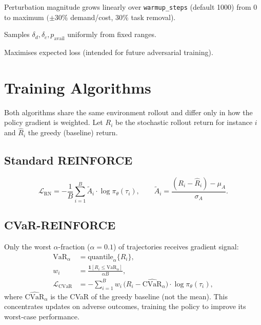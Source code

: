 \documentclass[11pt,a4paper]{article}
\begin{document}
\begin{description}[nosep]
  \item[\texttt{curriculum}:] Perturbation magnitude grows linearly over
        \texttt{warmup\_steps} (default 1000) from 0 to maximum
        $(\pm 30\%$ demand/cost, 30\% task removal).
  \item[\texttt{uniform}:] Samples $\delta_d, \delta_c, p_\text{avail}$
        uniformly from fixed ranges.
  \item[\texttt{adversarial}:] Maximises expected loss (intended for future
        adversarial training).
\end{description}

\section{Training Algorithms}

Both algorithms share the same environment rollout and differ only in how the
policy gradient is weighted. Let $R_i$ be the stochastic rollout return for
instance $i$ and $\hat{R}_i$ the greedy (baseline) return.

\subsection{Standard REINFORCE}

\begin{equation}
  \mathcal{L}_\text{RN} = -\frac{1}{B}\sum_{i=1}^{B}
  \widetilde{A}_i \cdot \log\pi_\theta(\tau_i),
  \qquad
  \widetilde{A}_i = \frac{(R_i - \hat{R}_i) - \mu_A}{\sigma_A}.
\end{equation}

\subsection{CVaR-REINFORCE}

Only the worst $\alpha$-fraction ($\alpha=0.1$) of trajectories receives
gradient signal:
\begin{align}
  \text{VaR}_\alpha &= \text{quantile}_\alpha\{R_i\}, \\
  w_i &= \frac{\mathbf{1}[R_i \leq \text{VaR}_\alpha]}{\alpha B}, \\
  \mathcal{L}_\text{CVaR} &= -\sum_{i=1}^{B} w_i\,
    \bigl(R_i - \widehat{\text{CVaR}}_\alpha\bigr)\cdot\log\pi_\theta(\tau_i),
\end{align}
where $\widehat{\text{CVaR}}_\alpha$ is the CVaR of the greedy baseline (not the
mean). This concentrates updates on adverse outcomes, training the policy to
improve its worst-case performance.
\end{document}
